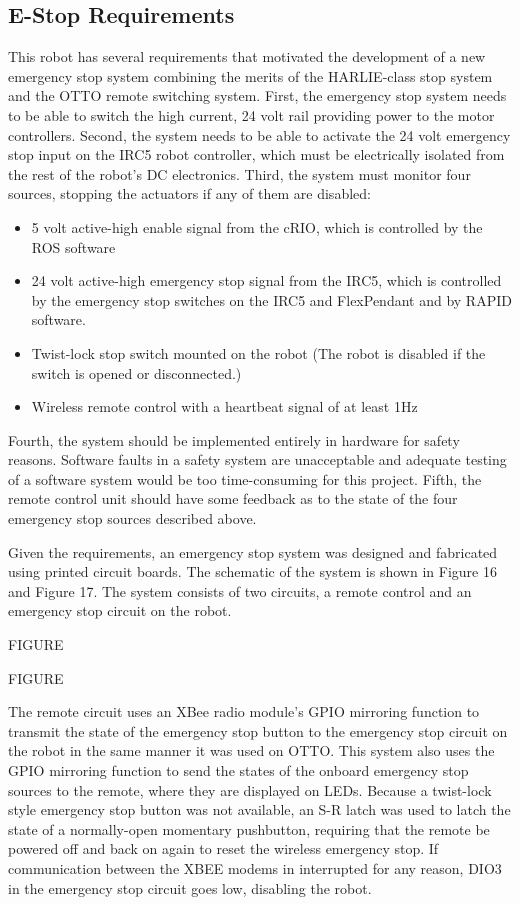 \documentclass[]{cwru} %
\begin{document}
\subsection{E-Stop Requirements}


This robot has several requirements that motivated the development of a
new emergency stop system combining the merits of the HARLIE-class stop
system and the OTTO remote switching system. First, the emergency stop
system needs to be able to switch the high current, 24 volt rail
providing power to the motor controllers. Second, the system needs to be
able to activate the 24 volt emergency stop input on the IRC5 robot
controller, which must be electrically isolated from the rest of the
robot's DC electronics. Third, the system must monitor four sources,
stopping the actuators if any of them are disabled:

\begin{itemize}
\item
  5 volt active-high enable signal from the cRIO, which is controlled by
  the ROS software
\item
  24 volt active-high emergency stop signal from the IRC5, which is
  controlled by the emergency stop switches on the IRC5 and FlexPendant
  and by RAPID software.
\item
  Twist-lock stop switch mounted on the robot (The robot is disabled if
  the switch is opened or disconnected.)
\item
  Wireless remote control with a heartbeat signal of at least 1Hz
\end{itemize}

Fourth, the system should be implemented entirely in hardware for safety
reasons. Software faults in a safety system are unacceptable and
adequate testing of a software system would be too time-consuming for
this project. Fifth, the remote control unit should have some feedback
as to the state of the four emergency stop sources described above.

Given the requirements, an emergency stop system was designed and
fabricated using printed circuit boards. The schematic of the system is
shown in Figure 16 and Figure 17. The system consists of two circuits, a
remote control and an emergency stop circuit on the robot.

FIGURE

FIGURE

The remote circuit uses an XBee radio module's GPIO mirroring function
to transmit the state of the emergency stop button to the emergency stop
circuit on the robot in the same manner it was used on OTTO. This system
also uses the GPIO mirroring function to send the states of the onboard
emergency stop sources to the remote, where they are displayed on LEDs.
Because a twist-lock style emergency stop button was not available, an
S-R latch was used to latch the state of a normally-open momentary
pushbutton, requiring that the remote be powered off and back on again
to reset the wireless emergency stop. If communication between the XBEE
modems in interrupted for any reason, DIO3 in the emergency stop circuit
goes low, disabling the robot.
\end{document}
